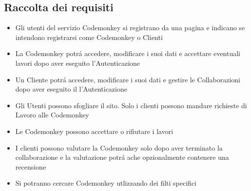 \subsection {Raccolta dei requisiti}

\begin{itemize}
\large
\item Gli utenti del servizio Codemonkey si registrano da una pagina e indicano se intendono registrarsi come Codemonkey o Clienti
\item La Codemonkey potrá accedere, modificare i suoi dati e accettare eventuali lavori dopo aver eseguito l'Autenticazione
\item Un Cliente potrá accedere, modificare i suoi dati e gestire le Collaborazioni dopo aver eseguito il l'Autenticazione
\item Gli Utenti possono sfogliare il sito. Solo i clienti possono mandare richieste di Lavoro alle Codemonkey
\item Le Codemonkey possono accettare o rifiutare i lavori
\item I clienti possono valutare la Codemonkey solo dopo aver terminato la collaborazione e la valutazione potrá ache opzionalmente contenere una recensione
\item Si potranno cercare Codemonkey utlizzando dei filti specifici
\end{itemize}
